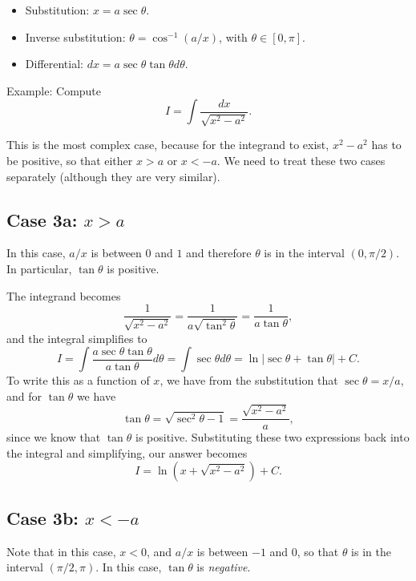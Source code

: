 \documentclass{article}
\begin{document}
\begin{itemize}
\item Substitution: $x = a \sec \theta$.
\item Inverse substitution: $\theta = \cos^{-1}(a/x)$, with $\theta \in [0, \pi]$.
\item Differential: $dx = a \sec \theta \tan \theta d\theta$.
\end{itemize}

Example: Compute
\[
  I = \int \frac{dx}{\sqrt{x^2 - a^2}}.
\]

This is the most complex case, because for the integrand to exist, $x^2 - a^2$ has to be positive, so that either $x > a$ or $x < -a$. We need to treat these two cases separately (although they are very similar).

\subsection*{Case 3a: $x > a$}

In this case, $a/x$ is between $0$ and $1$ and therefore $\theta$ is in the interval $(0, \pi/2)$. In particular, $\tan \theta$ is positive.

The integrand becomes
\[
  \frac{1}{\sqrt{x^2 - a^2}} = \frac{1}{a \sqrt{\tan^2 \theta}} = \frac{1}{a \tan \theta},
\]
and the integral simplifies to
\[
  I = \int \frac{a \sec \theta \tan \theta}{a \tan \theta} d \theta = \int \sec \theta d\theta = \ln \left| \sec \theta + \tan \theta \right| + C.
\]
To write this as a function of $x$, we have from the substitution that $\sec \theta = x/a$, and for $\tan \theta$ we have
\[
  \tan \theta = \sqrt{\sec^2 \theta - 1} = \frac{\sqrt{x^2 - a^2}}{a},
\]
since we know that $\tan \theta$ is positive. Substituting these two expressions back into the integral and simplifying, our answer becomes
\[
  I  = \ln \left( x + \sqrt{x^2 - a^2} \right) + C.
\]

\subsection*{Case 3b: $x < - a$}

Note that in this case, $x < 0$, and $a/x$ is between $-1$ and $0$, so that $\theta$ is in the interval $(\pi/2, \pi)$. In this case, $\tan \theta$ is \emph{negative}.
\end{document}
